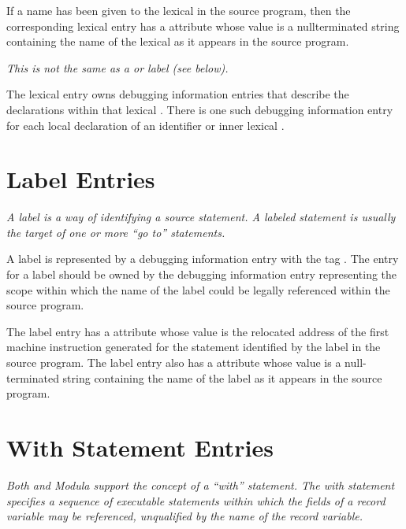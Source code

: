 If a name has been given to the 
lexical  
in the source
program, then the corresponding 
lexical  entry has a
 attribute whose 
value is a null\dash terminated string
containing the name of the lexical  
as it appears in
the source program.

\textit{This is not the same as a  or 
 label (see below).}

The lexical  entry owns 
debugging information entries that
describe the declarations within that lexical . 
There is
one such debugging information entry for each local declaration
of an identifier or inner lexical .

\section{Label Entries}
\label{chap:labelentries}
\textit{A label is a way of identifying a source statement. A labeled
statement is usually the target of one or more ``go to''
statements.
}

A label is represented by a debugging information entry with
the 
tag . 
The entry for a label should be owned by
the debugging information entry representing the scope within
which the name of the label could be legally referenced within
the source program.

The label entry has a  attribute whose value
is the relocated address of the first machine instruction
generated for the statement identified by the label in
the source program.  The label entry also has a 
 attribute 
whose value is a null-terminated string containing
the name of the label as it appears in the source program.


\section{With Statement Entries}
\label{chap:withstatemententries}

\textit{Both  and 
Modula support the concept of a ``with''
statement. The with statement specifies a sequence of
executable statements within which the fields of a record
variable may be referenced, unqualified by the name of the
record variable.}

